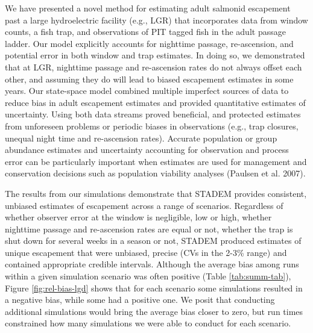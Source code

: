 \documentclass[
  12pt,
]{article}
\begin{document}
We have presented a novel method for estimating adult salmonid escapement past a large hydroelectric facility (e.g., LGR) that incorporates data from window counts, a fish trap, and observations of PIT tagged fish in the adult passage ladder. Our model explicitly accounts for nighttime passage, re-ascension, and potential error in both window and trap estimates. In doing so, we demonstrated that at LGR, nighttime passage and re-ascension rates do not always offset each other, and assuming they do will lead to biased escapement estimates in some years. Our state-space model combined multiple imperfect sources of data to reduce bias in adult escapement estimates and provided quantitative estimates of uncertainty. Using both data streams proved beneficial, and protected estimates from unforeseen problems or periodic biases in observations (e.g., trap closures, unequal night time and re-ascension rates). Accurate population or group abundance estimates and uncertainty accounting for observation and process error can be particularly important when estimates are used for management and conservation decisions such as population viability analyses (Paulsen et al. 2007).

The results from our simulations demonstrate that STADEM provides consistent, unbiased estimates of escapement across a range of scenarios. Regardless of whether observer error at the window is negligible, low or high, whether nighttime passage and re-ascension rates are equal or not, whether the trap is shut down for several weeks in a season or not, STADEM produced estimates of unique escapement that were unbiased, precise (CVs in the 2-3\% range) and contained appropriate credible intervals. Although the average bias among runs within a given simulation scenario was often positive (Table \ref{tab:summ-tab}), Figure \ref{fig:rel-bias-lgd} shows that for each scenario some simulations resulted in a negative bias, while some had a positive one. We posit that conducting additional simulations would bring the average bias closer to zero, but run times constrained how many simulations we were able to conduct for each scenario.
\end{document}
